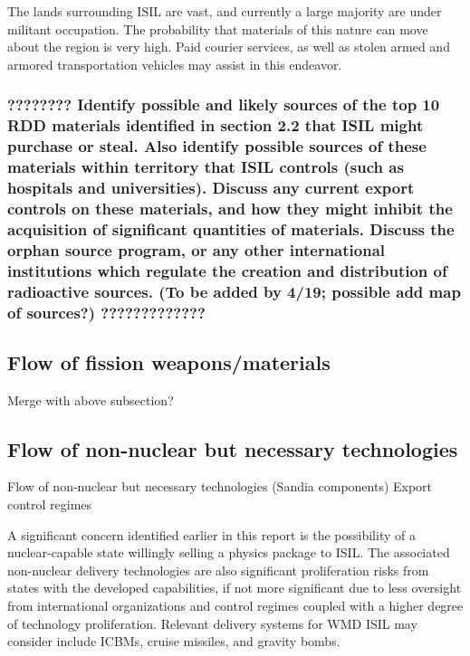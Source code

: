 \documentclass{report}
\begin{document}
The lands surrounding ISIL are vast, and currently a large majority are under militant occupation.  The probability that materials of this nature can move about the region is very high.  Paid courier services, as well as stolen armed and armored transportation vehicles  may assist in this endeavor.

\subsubsection{???????? Identify possible and likely sources of the top 10 RDD materials identified in section 2.2 that ISIL might purchase or steal. Also identify possible sources of these materials within territory that ISIL controls (such as hospitals and universities). Discuss any current export controls on these materials, and how they might inhibit the acquisition of significant quantities of materials. Discuss the orphan source program, or any other international institutions which regulate the creation and distribution of radioactive sources. (To be added by 4/19; possible add map of sources?) ?????????????} 
 
 \subsection{Flow of fission weapons/materials}

Merge with above subsection?


\subsection{Flow of non-nuclear but necessary technologies}

Flow of non-nuclear but necessary technologies (Sandia components)
Export control regimes

A significant concern identified earlier in this report is the possibility of a nuclear-capable state willingly selling a physics package to ISIL. The associated non-nuclear delivery technologies are also significant proliferation risks from states with the developed capabilities, if not more significant due to less oversight from international organizations and control regimes coupled with a higher degree of technology proliferation. Relevant delivery systems for WMD ISIL may consider include ICBMs, cruise missiles, and gravity bombs. 
\end{document}
